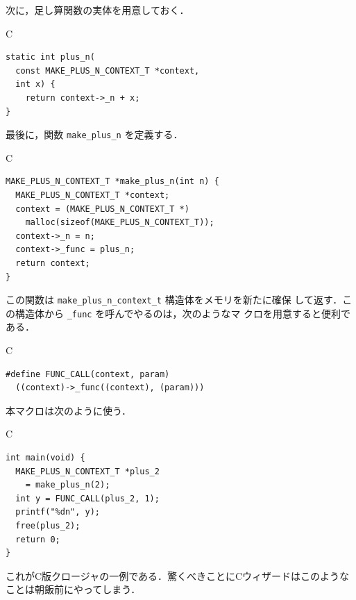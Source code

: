 \documentclass[a5paper,twoside,fleqn]{jsbook}
\newcommand{\programminglanguage}[1]{\textsf{#1}}
\newcommand{\clang}{\programminglanguage{C}}
\newcommand{\code}[1]{\texttt{#1}}
\newenvironment{ccode}{\begin{itembox}[r]{\clang}}{\end{itembox}}
\begin{document}
次に，足し算関数の実体を用意しておく．
\begin{ccode}
\begin{verbatim}
static int plus_n(
  const MAKE_PLUS_N_CONTEXT_T *context,
  int x) {
    return context->_n + x;
}
\end{verbatim}
\end{ccode}

最後に，関数 \code{make\_plus\_n} を定義する．
\begin{ccode}
\begin{verbatim}
MAKE_PLUS_N_CONTEXT_T *make_plus_n(int n) {
  MAKE_PLUS_N_CONTEXT_T *context;
  context = (MAKE_PLUS_N_CONTEXT_T *)
    malloc(sizeof(MAKE_PLUS_N_CONTEXT_T));
  context->_n = n;
  context->_func = plus_n;
  return context;
}
\end{verbatim}
\end{ccode}
この関数は \code{make\_plus\_n\_context\_t} 構造体をメモリを新たに確保
して返す．この構造体から \code{\_func} を呼んでやるのは，次のようなマ
クロを用意すると便利である．
\begin{ccode}
\begin{verbatim}
#define FUNC_CALL(context, param)
  ((context)->_func((context), (param)))
\end{verbatim}
\end{ccode}
本マクロは次のように使う．
\begin{ccode}
\begin{verbatim}
int main(void) {
  MAKE_PLUS_N_CONTEXT_T *plus_2
    = make_plus_n(2);
  int y = FUNC_CALL(plus_2, 1);
  printf("%dn", y);
  free(plus_2);
  return 0;
}
\end{verbatim}
\end{ccode}
これが\clang 版クロージャの一例である．驚くべきことに\clang ウィザードはこのようなことは朝飯前にやってしまう．

\end{document}
